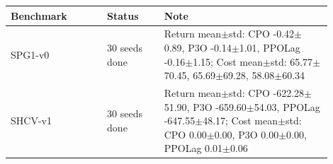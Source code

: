 \footnotesize
\setlength{\tabcolsep}{3pt}
\begin{tabular}{p{0.27\linewidth}p{0.16\linewidth}p{0.47\linewidth}}
\toprule
Benchmark & Status & Note \\
\midrule
SPG1-v0 & 30 seeds done & Return mean$\pm$std: CPO -0.42$\pm$0.89, P3O -0.14$\pm$1.01, PPOLag -0.16$\pm$1.15; Cost mean$\pm$std: 65.77$\pm$70.45, 65.69$\pm$69.28, 58.08$\pm$60.34 \\
SHCV-v1 & 30 seeds done & Return mean$\pm$std: CPO -622.28$\pm$51.90, P3O -659.60$\pm$54.03, PPOLag -647.55$\pm$48.17; Cost mean$\pm$std: CPO 0.00$\pm$0.00, P3O 0.00$\pm$0.00, PPOLag 0.01$\pm$0.06 \\
\bottomrule
\end{tabular}
